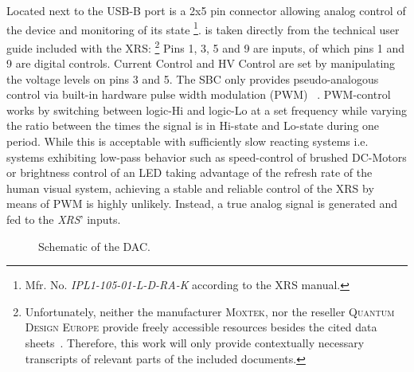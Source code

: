             Located next to the USB-B port is a 2x5 pin connector allowing analog control of the device and monitoring of its state%
            \footnote{%
            Mfr. No. \textit{IPL1-105-01-L-D-RA-K} according to the XRS manual.%
            }.
             is taken directly from the technical user guide included with the XRS:%
            \footnote{%
            Unfortunately, neither the manufacturer \textsc{Moxtek}, nor the reseller \textsc{Quantum Design Europe} provide freely accessible resources besides the cited data sheets~\cites{Manual.MAGPRODataSheet.MOXTEK}{Manual.MAGPRODataSheet.QD}.
            Therefore, this work will only provide contextually necessary transcripts of relevant parts of the included documents.}
            Pins 1, 3, 5 and 9 are inputs, of which pins 1 and 9 are digital controls.
            Current Control and HV Control are set by manipulating the voltage levels on pins 3 and 5.
            The SBC only provides pseudo-analogous control via built-in hardware pulse width modulation (PWM) ~\cite{Manual.Documentation.RPF}.
            PWM-control works by switching between logic-Hi and logic-Lo at a set frequency while varying the ratio between the times the signal is in Hi-state and Lo-state during one period.
            While this is acceptable with sufficiently slow reacting systems i.e. systems exhibiting low-pass behavior such as speed-control of brushed DC-Motors or brightness control of an LED taking advantage of the refresh rate of the human visual system, achieving a stable and reliable control of the XRS by means of PWM is highly unlikely.
            Instead, a true analog signal is generated and fed to the \textit{XRS}' inputs.

            \begin{figure}[h]
                \centering
                
                \caption[Schematic of the DAC]{Schematic of the DAC.}%
                \label{fig:DAC schematic}
            \end{figure}

